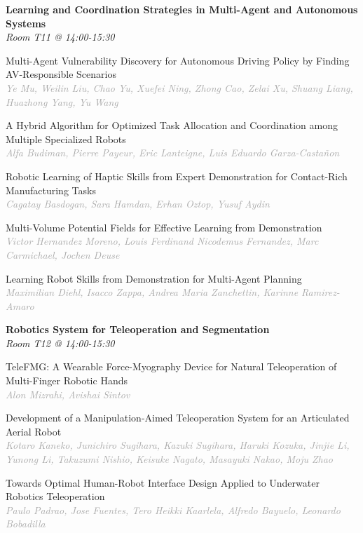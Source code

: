 \begin{multicols*}{2}
\normalsize \textbf{Learning and Coordination Strategies in Multi-Agent and Autonomous Systems}\\
\small \textit{Room T11 @ 14:00-15:30}

\small Multi-Agent Vulnerability Discovery for Autonomous Driving Policy by Finding AV-Responsible Scenarios\\ 
\footnotesize \textcolor{darkgray}{\textit{Ye Mu, Weilin  Liu, Chao  Yu, Xuefei  Ning, Zhong  Cao, Zelai  Xu, Shuang  Liang, Huazhong  Yang, Yu  Wang}}

\small A Hybrid Algorithm for Optimized Task Allocation and Coordination among Multiple Specialized Robots\\ 
\footnotesize \textcolor{darkgray}{\textit{Alfa Budiman, Pierre  Payeur, Eric  Lanteigne, Luis Eduardo  Garza-Castañon}}

\small Robotic Learning of Haptic Skills from Expert Demonstration for Contact-Rich Manufacturing Tasks\\ 
\footnotesize \textcolor{darkgray}{\textit{Cagatay Basdogan, Sara  Hamdan, Erhan  Oztop, Yusuf  Aydin}}

\small Multi-Volume Potential Fields for Effective Learning from Demonstration\\ 
\footnotesize \textcolor{darkgray}{\textit{Victor Hernandez Moreno, Louis Ferdinand Nicodemus  Fernandez, Marc  Carmichael, Jochen  Deuse}}

\small Learning Robot Skills from Demonstration for Multi-Agent Planning\\ 
\footnotesize \textcolor{darkgray}{\textit{Maximilian Diehl, Isacco  Zappa, Andrea Maria  Zanchettin, Karinne  Ramirez-Amaro}}

\normalsize \textbf{Robotics System for Teleoperation and Segmentation}\\
\small \textit{Room T12 @ 14:00-15:30}

\small TeleFMG: A Wearable Force-Myography Device for Natural Teleoperation of Multi-Finger Robotic Hands\\ 
\footnotesize \textcolor{darkgray}{\textit{Alon Mizrahi, Avishai  Sintov}}

\small Development of a Manipulation-Aimed Teleoperation System for an Articulated Aerial Robot\\ 
\footnotesize \textcolor{darkgray}{\textit{Kotaro Kaneko, Junichiro  Sugihara, Kazuki  Sugihara, Haruki  Kozuka, Jinjie  Li, Yunong  Li, Takuzumi  Nishio, Keisuke  Nagato, Masayuki  Nakao, Moju  Zhao}}

\small Towards Optimal Human-Robot Interface Design Applied to Underwater Robotics Teleoperation\\ 
\footnotesize \textcolor{darkgray}{\textit{Paulo Padrao, Jose  Fuentes, Tero Heikki  Kaarlela, Alfredo  Bayuelo, Leonardo  Bobadilla}}


\end{multicols*}
